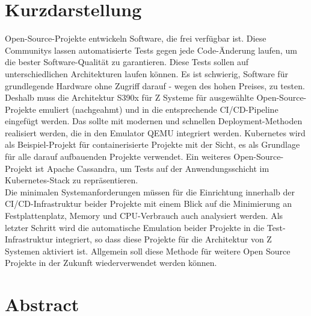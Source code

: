 \thispagestyle{empty}
\section*{Kurzdarstellung}
\label{sec:kurzdarstellung}
Open-Source-Projekte entwickeln Software, die frei verfügbar ist. Diese Communitys lassen automatisierte Tests gegen jede Code-Änderung laufen, um die bester Software-Qualität zu garantieren. 
Diese Tests sollen auf unterschiedlichen Architekturen laufen können. Es ist schwierig, Software für grundlegende Hardware ohne Zugriff darauf - wegen des hohen Preises, zu testen. Deshalb muss die Architektur S390x für Z Systeme für ausgewählte Open-Source-Projekte emuliert (nachgeahmt) und in die entsprechende CI/CD-Pipeline eingefügt werden. Das sollte mit modernen und schnellen Deployment-Methoden realisiert werden, die in den Emulator QEMU integriert werden. Kubernetes wird als Beispiel-Projekt für containerisierte Projekte mit der Sicht, es als Grundlage für alle darauf aufbauenden Projekte verwendet. Ein weiteres Open-Source-Projekt ist Apache Cassandra, um Tests auf der Anwendungsschicht im Kubernetes-Stack zu repräsentieren. \\
Die minimalen Systemanforderungen müssen für die Einrichtung innerhalb der CI/CD-Infrastruktur beider Projekte mit einem Blick auf die Minimierung an Festplattenplatz, Memory und CPU-Verbrauch auch analysiert werden. Als letzter Schritt wird die automatische Emulation beider Projekte in die Test-Infrastruktur integriert, so dass diese Projekte für die Architektur von Z Systemen aktiviert ist. Allgemein soll diese Methode für weitere Open Source Projekte in der Zukunft wiederverwendet werden können.



\section*{Abstract}
\label{sec:abstract}

